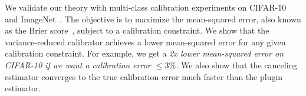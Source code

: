 We validate our theory  with multi-class calibration experiments on CIFAR-10~\cite{krizhevsky2009learningmultiple} and ImageNet~\cite{deng2009imagenet}.
The objective is to maximize the mean-squared error, also known as the Brier score~\cite{brier1950verification}, subject to a calibration constraint.
We show that the variance-reduced calibrator achieves a lower mean-squared error for any given calibration constraint.
For example, we get a \emph{2x lower mean-squared error on CIFAR-10 if we want a calibration error $\leq 3\%$.}
We also show that the canceling estimator converges to the true calibration error much faster than the plugin estimator.

